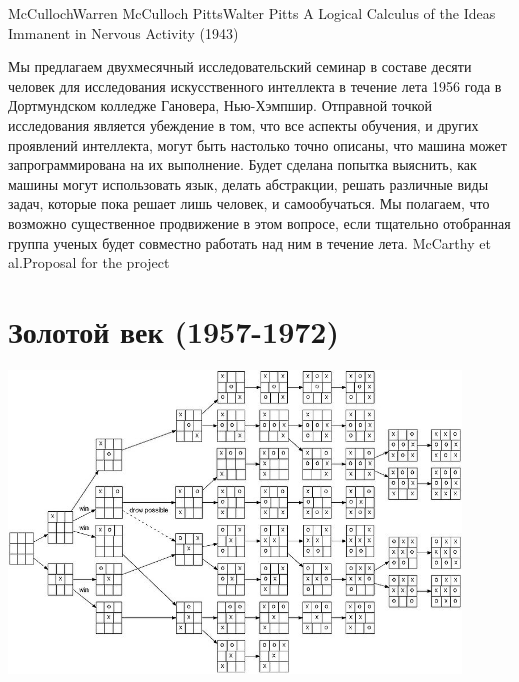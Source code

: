\documentclass[24pt,pdf,hyperref={unicode},aspectratio=169]{beamer}
\begin{document}
\begin{frame}
\doublebio
{McCulloch}{Warren McCulloch}
{Pitts}{Walter Pitts}
{A Logical Calculus of the Ideas Immanent in Nervous Activity (1943)}
\end{frame}

\begin{frame}
\end{frame}

\begin{frame}
\citate
{
Мы предлагаем двухмесячный исследовательский семинар в составе десяти человек для исследования искусственного интеллекта в течение лета 1956 года в Дортмундском колледже Гановера, Нью-Хэмпшир. Отправной точкой исследования является убеждение в том, что все аспекты обучения, и других проявлений интеллекта, могут быть настолько точно описаны, что машина может запрограммирована на их выполнение. Будет сделана попытка выяснить, как машины могут использовать язык, делать абстракции, решать различные виды задач, которые пока решает лишь человек, и самообучаться. Мы полагаем, что возможно существенное продвижение в этом вопросе, если тщательно отобранная группа ученых будет совместно работать над ним в течение лета.
}{McCarthy et al.}{Proposal for the project}
\end{frame}

\section{Золотой век (1957-1972)}

\begin{frame}
\begin{center}
 \includegraphics[width=0.9\textwidth]{tictactoe.jpg}
\end{center}
\end{frame}
\end{document}
